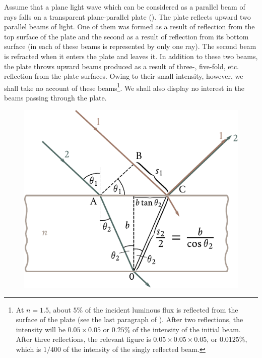 Assume that a plane light wave which can be considered as a parallel beam of rays falls on a transparent plane-parallel plate ().
The plate reflects upward two parallel beams of light.
One of them was formed as a result of reflection from the top surface of the plate and the second as a result of reflection from its bottom surface (in  each of these beams is  represented by only one ray).
The second beam is refracted when it enters the plate and leaves it.
In addition to these two beams, the plate throws upward beams produced as a result of three-, five-fold, etc. reflection from the plate surfaces.
Owing to their small intensity, however, we shall take no account of these beams\footnote{At $n=1.5$, about $5\%$ of the incident luminous flux is reflected from the surface of the plate (see the last paragraph of ). After two reflections, the intensity will be $0.05\times 0.05$ or $0.25\%$ of the intensity of the initial beam. After three reflections, the relevant figure is $0.05\times 0.05\times 0.05$, or $0.0125\%$, which is $1/400$ of the intensity of the singly reflected beam.}.
We shall also display no interest in the beams passing through the plate.

\begin{figure}[t]
	\begin{center}
		\includegraphics[scale=0.95]{figures/ch_17/fig_17_10.pdf}
		\caption[]{}
		\label{fig:17_10}
	\end{center}
	\vspace{-0.8cm}
\end{figure}


